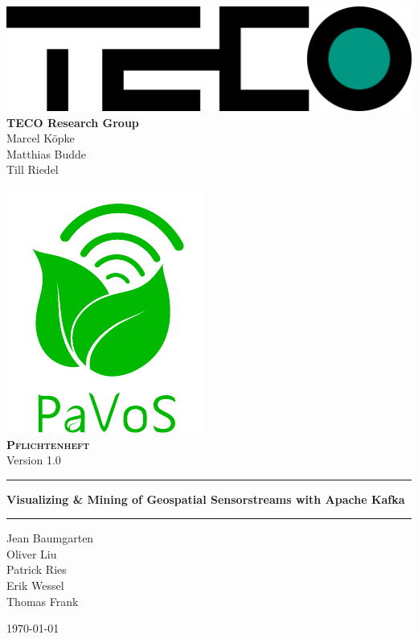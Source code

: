 \begin{titlepage}
	\begin{center}
	\includegraphics[width=0.5\linewidth]{images/TECOLogo.png}\\[0.2cm]

	\textbf{TECO Research Group}\\[0.2cm]
	Marcel Köpke\\Matthias Budde\\Till Riedel\\
	\vspace{1cm}
	
	\includegraphics[width=0.33\linewidth]{images/PaVoSLogo-Erweitert}\\[1cm]
	
	\textsc{\textbf{\LARGE Pflichtenheft}}\\
	{\small Version 1.0}\\
	
	\vspace{1cm}\hrule\vspace{0.4cm}
	\textbf{\huge Visualizing \& Mining of Geospatial Sensorstreams with Apache Kafka}\\
	\vspace{0.4cm}\hrule\vspace{1cm}
	
	{\Large Jean Baumgarten\\
	Oliver Liu\\
	Patrick Ries\\
	Erik Wessel\\
	Thomas Frank\\}

	\vspace{1cm}
	\today
	
	\end{center}
\end{titlepage}